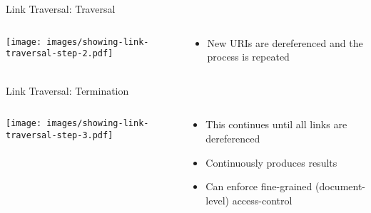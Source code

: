 \begin{frame}{Link Traversal: Traversal}
    \begin{columns}[T] %
        \begin{column}{0.6\textwidth} %
            \texttt{[image: images/showing-link-traversal-step-2.pdf]} %
        \end{column}

        \begin{column}{0.4\textwidth} %
            \begin{itemize}
                \item New URIs are dereferenced and the process is repeated
            \end{itemize}
        \end{column}
    \end{columns}
\end{frame}



\begin{frame}{Link Traversal: Termination}
    \begin{columns}[T] %
        \begin{column}{0.6\textwidth} %
            \texttt{[image: images/showing-link-traversal-step-3.pdf]} %
        \end{column}

        \begin{column}{0.4\textwidth} %
            \begin{itemize}
                \item This continues until all links are dereferenced
                \item Continuously produces results
                \item Can enforce fine-grained (document-level) access-control

            \end{itemize}
        \end{column}
    \end{columns}
\end{frame}